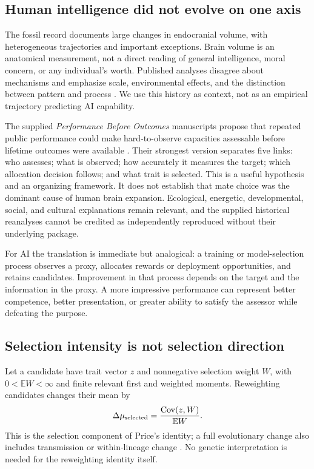 \documentclass[10pt,twocolumn,letterpaper]{article}
\newcommand{\E}{\mathbb E}
\newcommand{\Cov}{\operatorname{Cov}}
\begin{document}
\subsection{Human intelligence did not evolve on one axis}
The fossil record documents large changes in endocranial volume, with heterogeneous trajectories and important exceptions. Brain volume is an anatomical measurement, not a direct reading of general intelligence, moral concern, or any individual's worth. Published analyses disagree about mechanisms and emphasize scale, environmental effects, and the distinction between pattern and process \cite{gingerich,du,will}. We use this history as context, not as an empirical trajectory predicting AI capability.

The supplied \emph{Performance Before Outcomes} manuscripts propose that repeated public performance could make hard-to-observe capacities assessable before lifetime outcomes were available \cite{performance}. Their strongest version separates five links: who assesses; what is observed; how accurately it measures the target; which allocation decision follows; and what trait is selected. This is a useful hypothesis and an organizing framework. It does not establish that mate choice was the dominant cause of human brain expansion. Ecological, energetic, developmental, social, and cultural explanations remain relevant, and the supplied historical reanalyses cannot be credited as independently reproduced without their underlying package.

For AI the translation is immediate but analogical: a training or model-selection process observes a proxy, allocates rewards or deployment opportunities, and retains candidates. Improvement in that process depends on the target and the information in the proxy. A more impressive performance can represent better competence, better presentation, or greater ability to satisfy the assessor while defeating the purpose.

\subsection{Selection intensity is not selection direction}
Let a candidate have trait vector $z$ and nonnegative selection weight $W$, with $0<\E W<\infty$ and finite relevant first and weighted moments. Reweighting candidates changes their mean by
\begin{equation}
\Delta\mu_{\rm selected}=\frac{\Cov(z,W)}{\E W}.
\label{eq:selection}
\end{equation}
This is the selection component of Price's identity; a full evolutionary change also includes transmission or within-lineage change \cite{price}. No genetic interpretation is needed for the reweighting identity itself.
\end{document}
